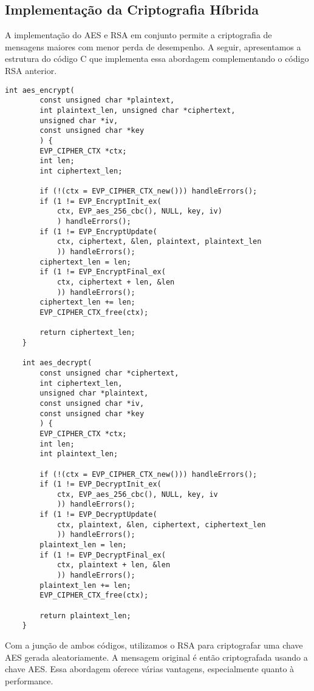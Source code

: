 \documentclass[a4paper,12pt]{article}
\begin{document}
\subsection*{Implementação da Criptografia Híbrida}
A implementação do AES e RSA em conjunto permite a criptografia de mensagens maiores com menor perda de desempenho. A seguir, apresentamos a estrutura do código C que implementa essa abordagem complementando o código RSA anterior.

\begin{lstlisting}[style=CStyle]
    int aes_encrypt(
        const unsigned char *plaintext,
        int plaintext_len, unsigned char *ciphertext,
        unsigned char *iv,
        const unsigned char *key
        ) {
        EVP_CIPHER_CTX *ctx;
        int len;
        int ciphertext_len;

        if (!(ctx = EVP_CIPHER_CTX_new())) handleErrors();
        if (1 != EVP_EncryptInit_ex(
            ctx, EVP_aes_256_cbc(), NULL, key, iv)
            ) handleErrors();
        if (1 != EVP_EncryptUpdate(
            ctx, ciphertext, &len, plaintext, plaintext_len
            )) handleErrors();
        ciphertext_len = len;
        if (1 != EVP_EncryptFinal_ex(
            ctx, ciphertext + len, &len
            )) handleErrors();
        ciphertext_len += len;
        EVP_CIPHER_CTX_free(ctx);

        return ciphertext_len;
    }

    int aes_decrypt(
        const unsigned char *ciphertext,
        int ciphertext_len,
        unsigned char *plaintext,
        const unsigned char *iv,
        const unsigned char *key
        ) {
        EVP_CIPHER_CTX *ctx;
        int len;
        int plaintext_len;

        if (!(ctx = EVP_CIPHER_CTX_new())) handleErrors();
        if (1 != EVP_DecryptInit_ex(
            ctx, EVP_aes_256_cbc(), NULL, key, iv
            )) handleErrors();
        if (1 != EVP_DecryptUpdate(
            ctx, plaintext, &len, ciphertext, ciphertext_len
            )) handleErrors();
        plaintext_len = len;
        if (1 != EVP_DecryptFinal_ex(
            ctx, plaintext + len, &len
            )) handleErrors();
        plaintext_len += len;
        EVP_CIPHER_CTX_free(ctx);

        return plaintext_len;
    }
\end{lstlisting}

Com a junção de ambos códigos, utilizamos o RSA para criptografar uma chave AES gerada aleatoriamente. A mensagem original é então criptografada usando a chave AES. Essa abordagem oferece várias vantagens, especialmente quanto à performance.
\end{document}
